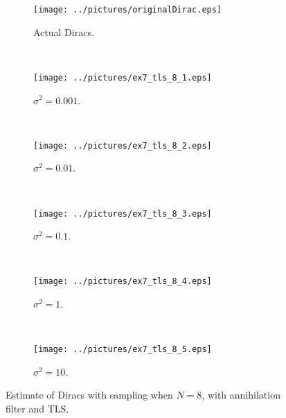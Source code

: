 \documentclass[11pt,a4paper]{report}
\begin{document}
\begin{figure}[H]
    \captionsetup[subfigure]{position=b}
    \centering
    \begin{subfigure}{0.49\textwidth}
        \texttt{[image: ../pictures/originalDirac.eps]}
        \caption{Actual Diracs.}
        \label{fig:ex7_tls_8_0}
    \end{subfigure}
    ~
    \begin{subfigure}{0.49\textwidth}
        \texttt{[image: ../pictures/ex7\_tls\_8\_1.eps]}
        \caption{$\sigma^2 = 0.001$.}
        \label{fig:ex7_tls_8_1}
    \end{subfigure}
    \\
    \begin{subfigure}{0.49\textwidth}
        \texttt{[image: ../pictures/ex7\_tls\_8\_2.eps]}
        \caption{$\sigma^2 = 0.01$.}
        \label{fig:ex7_tls_8_2}
    \end{subfigure}
    ~
    \begin{subfigure}{0.49\textwidth}
        \texttt{[image: ../pictures/ex7\_tls\_8\_3.eps]}
        \caption{$\sigma^2 = 0.1$.}
        \label{fig:ex7_tls_8_3}
    \end{subfigure}
    \\
    \begin{subfigure}{0.49\textwidth}
        \texttt{[image: ../pictures/ex7\_tls\_8\_4.eps]}
        \caption{$\sigma^2 = 1$.}
        \label{fig:ex7_tls_8_4}
    \end{subfigure}
    ~
    \begin{subfigure}{0.49\textwidth}
        \texttt{[image: ../pictures/ex7\_tls\_8\_5.eps]}
        \caption{$\sigma^2 = 10$.}
        \label{fig:ex7_tls_8_5}
    \end{subfigure}

    \caption{Estimate of Diracs with sampling when $N = 8$, with annihilation filter and TLS.}
    \label{fig:ex7_tls_8}
\end{figure}

\end{document}
